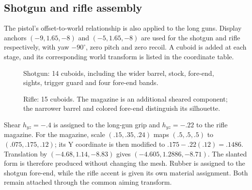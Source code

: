\subsection{Shotgun and rifle assembly}
The pistol's offset-to-world relationship is also applied to the long guns. Display anchors $(-9,1.65,-8)$ and $(-5,1.65,-8)$ are used for the shotgun and rifle respectively, with yaw $-90^\circ$, zero pitch and zero recoil. A cuboid is added at each stage, and its corresponding world transform is listed in the coordinate table.
\begin{figure}[htbp]

\caption{Shotgun: 14 cuboids, including the wider barrel, stock, fore-end, sights, trigger guard and four fore-end bands.}
\end{figure}

\begin{figure}[htbp]

\caption{Rifle: 15 cuboids. The magazine is an additional sheared component; the narrower barrel and colored fore-end distinguish its silhouette.}
\end{figure}

Shear $h_{yz}=-.4$ is assigned to the long-gun grip and $h_{yz}=-.22$ to the rifle magazine. For the magazine, scale $(.15,.35,.24)$ maps $(.5,.5,.5)$ to $(.075,.175,.12)$; its Y coordinate is then modified to $.175-.22(.12)=.1486$. Translation by $(-4.68,1.14,-8.83)$ gives $(-4.605,1.2886,-8.71)$. The slanted form is therefore produced without changing the mesh. Rubber is assigned to the shotgun fore-end, while the rifle accent is given its own material assignment. Both remain attached through the common aiming transform.

